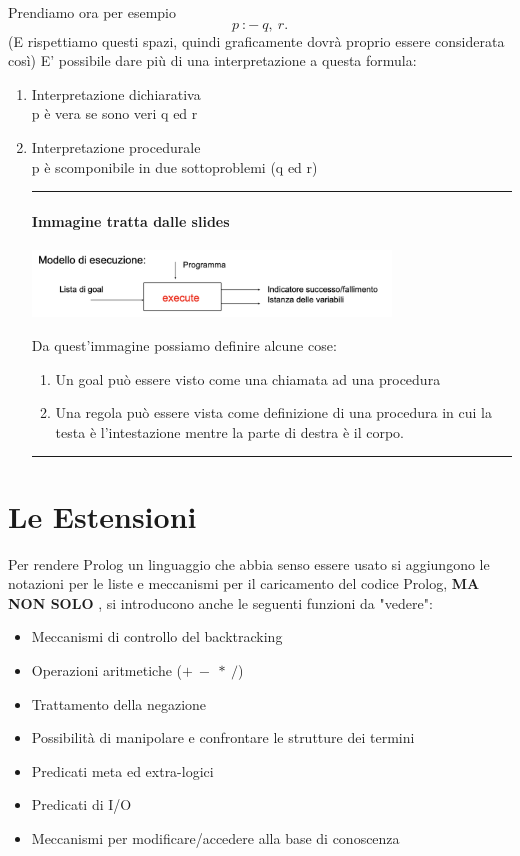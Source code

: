 \documentclass[12pt, a4paper, openany, oneside]{book}
\begin{document}
Prendiamo ora per esempio \[p~:-~q,~r.\](E rispettiamo questi spazi, quindi 
graficamente dovrà proprio essere considerata così) E' possibile dare più di una
interpretazione a questa formula:
\begin{enumerate}
	\item Interpretazione dichiarativa\\
	p è \color{red}vera se  \color{black}sono veri q ed r
	\item Interpretazione procedurale\\
	p è scomponibile in due sottoproblemi (q ed r)\\
	{\color{black} \rule{\linewidth}{0.3mm}}
	\paragraph{Immagine tratta dalle slides}
	\begin{center}
	\includegraphics[width=0.75\textwidth]{2}
	\end{center}
	Da quest'immagine possiamo definire alcune cose:
	\begin{enumerate}
		\item Un goal può essere visto come una chiamata ad una procedura
		\item Una regola può essere vista come definizione di una procedura in
		cui la testa è l'intestazione mentre la parte di destra è il corpo.
	\end{enumerate}
	{\color{black} \rule{\linewidth}{0.3mm}}
\end{enumerate}
\section{Le Estensioni}
Per rendere Prolog un linguaggio che abbia senso essere usato si aggiungono le
notazioni per le liste e meccanismi per il caricamento del codice Prolog,
\color{red} \textbf{MA NON SOLO} \color{black}, si introducono anche le seguenti
funzioni da "vedere":
\begin{itemize}
	\item Meccanismi di controllo del backtracking
	\item Operazioni aritmetiche ($+~-~*~/$)
	\item Trattamento della negazione
	\item Possibilità di manipolare e confrontare le strutture dei termini
	\item Predicati meta ed extra-logici
	\item Predicati di I/O
	\item Meccanismi per modificare/accedere alla base di conoscenza
\end{itemize}
\end{document}
